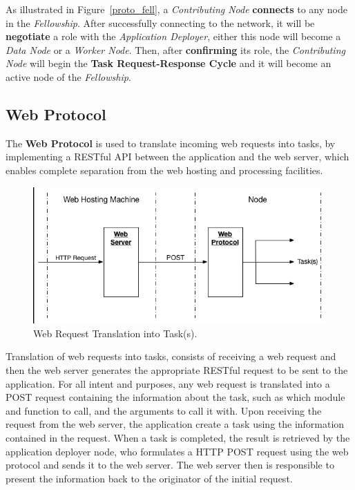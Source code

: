 \documentclass[12pt, titlepage]{uo_temp}
\begin{document}
     As illustrated in Figure~\ref{proto_fell}, a \emph{Contributing Node}
     \textbf{connects} to any node in the \emph{Fellowship}. After successfully connecting
     to the network, it will be \textbf{negotiate} a role with the \emph{Application
       Deployer}, either this node will become a \emph{Data Node} or a \emph{Worker
       Node}. Then, after \textbf{confirming} its role, the \emph{Contributing Node} will
     begin the \textbf{Task Request-Response Cycle} and it will become an active node of
     the \emph{Fellowship}.


     \subsection{Web Protocol}
     The \textbf{Web Protocol} is used to translate incoming web requests into tasks, by
     implementing a RESTful API between the application and the web server, which enables
     complete separation from the web hosting and processing facilities.

     \begin{figure}[h]
       \centering
       \includegraphics[width=125mm]{images/web_protocol.png}
       \caption{Web Request Translation into Task(s).}
     \end{figure}
     Translation of web requests into tasks, consists of receiving a web request and then the
     web server generates the appropriate RESTful request to be sent to the
     application. For all intent and purposes, any web request is translated into a POST
     request containing the information about the task, such as which module and function
     to call, and the arguments to call it with. Upon receiving the request from the web
     server, the application create a task using the information contained in the request.
     When a task is completed, the result is retrieved by the application deployer node,
     who formulates a HTTP POST request using the web protocol and sends it to the web
     server. The web server then is responsible to present the information back to the
     originator of the initial request.
\end{document}

